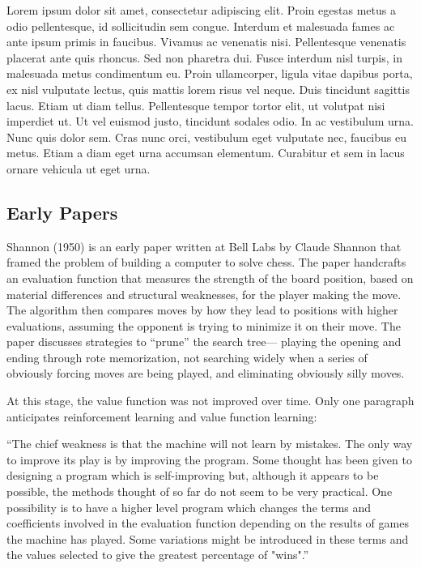 Lorem ipsum dolor sit amet, consectetur adipiscing elit. Proin egestas metus a odio pellentesque, id sollicitudin sem congue. Interdum et malesuada fames ac ante ipsum primis in faucibus. Vivamus ac venenatis nisi. Pellentesque venenatis placerat ante quis rhoncus. Sed non pharetra dui. Fusce interdum nisl turpis, in malesuada metus condimentum eu. Proin ullamcorper, ligula vitae dapibus porta, ex nisl vulputate lectus, quis mattis lorem risus vel neque. Duis tincidunt sagittis lacus. Etiam ut diam tellus. Pellentesque tempor tortor elit, ut volutpat nisi imperdiet ut. Ut vel euismod justo, tincidunt sodales odio. In ac vestibulum urna. Nunc quis dolor sem. Cras nunc orci, vestibulum eget vulputate nec, faucibus eu metus. Etiam a diam eget urna accumsan elementum. Curabitur et sem in lacus ornare vehicula ut eget urna.


%

\subsection{Early Papers}

Shannon (1950) is an early paper written at Bell Labs by Claude Shannon that framed the problem of building a computer to solve chess. The paper handcrafts an evaluation function that measures the strength of the board position, based on material differences and structural weaknesses,  for the player making the move. The algorithm then compares moves by how they lead to positions with higher evaluations, assuming the opponent is trying to minimize it on their move. The paper discusses strategies to ``prune” the search tree— playing the opening and ending through rote memorization, not searching widely when a series of obviously forcing moves are being played, and eliminating obviously silly moves.

At this stage, the value function was not improved over time. Only one paragraph anticipates reinforcement learning and value function learning:

“The chief weakness is that the machine will not learn by mistakes. The only way to improve its play is by improving the program. Some thought has been given to designing a program which is self-improving but, although it appears to be possible, the methods thought of so far do not seem to be very practical. One possibility is to have a higher level program which changes the terms and coefficients involved in the evaluation function depending on the results of games the machine has played. Some variations might be introduced in these terms and the values selected to give the greatest percentage of "wins".”

